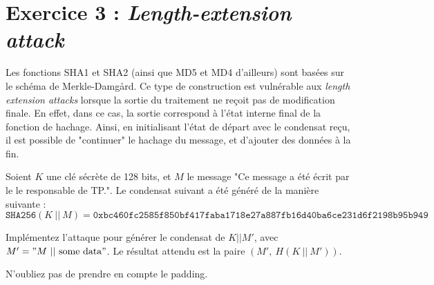 \documentclass[french,a4paper,11pt]{exam}
\begin{document}
	
		
	
	\section*{Exercice 3 : \textit{Length-extension attack}}
	
	Les fonctions SHA1 et SHA2 (ainsi que MD5 et MD4 d'ailleurs) sont basées sur le schéma de Merkle-Damgård. Ce type de construction est vulnérable aux \textit{length extension attacks} lorsque la sortie du traitement ne reçoit pas de modification finale. En effet, dans ce cas, la sortie correspond à l'état interne final de la fonction de hachage. Ainsi, en initialisant l'état de départ avec le condensat reçu, il est possible de "continuer" le hachage du message, et d'ajouter des données à la fin.

	Soient $K$ une clé sécrète de 128 bits, et $M$ le message "Ce message a été écrit par le le responsable de TP.". Le condensat suivant a été généré de la manière suivante : 
	$$\texttt{SHA256}(K\ ||\ M) = \texttt{0xbc460fc2585f850bf417faba1718e27a887fb16d40ba6ce231d6f2198b95b949}$$ 

	\vspace*{0.2cm}
	\noindent Implémentez l'attaque pour générer le condensat de $K || M'$, avec $M' = "M\ ||\ \text{some data}"$. Le résultat attendu est la paire $(M',\ H(K\ ||\ M'))$.

	\noindent N'oubliez pas de prendre en compte le padding.
	
\end{document}
